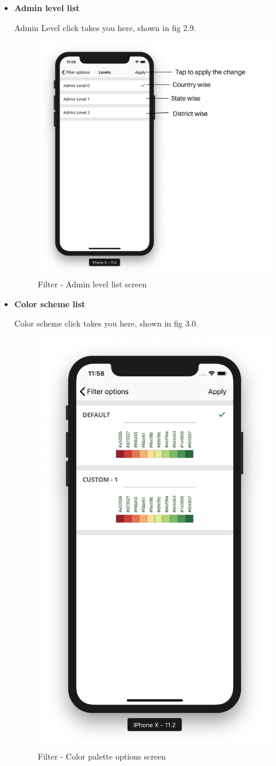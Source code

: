 \begin{itemize}
\begin{itemize}
        \item \textbf{Admin level list}
        
        Admin Level click takes you here, shown in fig 2.9.
        
         \begin{figure}[H]
            \centering
            \includegraphics[width=0.50\linewidth]{figures/ch2/level_list.png}
            \caption{\label{fig:level_list_screen} Filter - Admin level list screen}
        \end{figure}

     \item \textbf{Color scheme list}
     
     Color scheme click takes you here, shown in fig 3.0.
        
        \begin{figure}[H]
            \centering
            \includegraphics[width=0.50\linewidth]{figures/ch2/color_scheme.png}
            \caption{\label{fig:level_list_screen} Filter - Color palette  options screen}
        \end{figure}
        
    \end{itemize}

\end{itemize}



